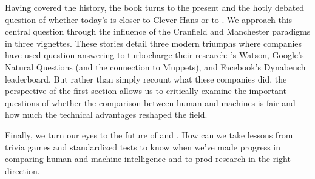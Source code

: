 Having covered the history, the book turns to the present and the
hotly debated question of whether today's  is closer to Clever
Hans or to .
%
We approach this central question through the
influence of the Cranfield and Manchester paradigms in three vignettes.
%
These stories detail three modern  triumphs where companies
have used question answering to turbocharge their 
research: 's Watson, Google's Natural Questions (and the connection to Muppets), and
Facebook's Dynabench leaderboard.
%
But rather than simply recount what these companies did, the
perspective of the first section allows us to critically examine the
important questions of whether the comparison between human and
machines is fair and how much the technical advantages reshaped the
field.

Finally, we turn our eyes to the future of  and .
%
How can we take lessons from trivia games and standardized tests to know
when we've made progress in comparing human and machine intelligence
and to prod research in the right direction.

